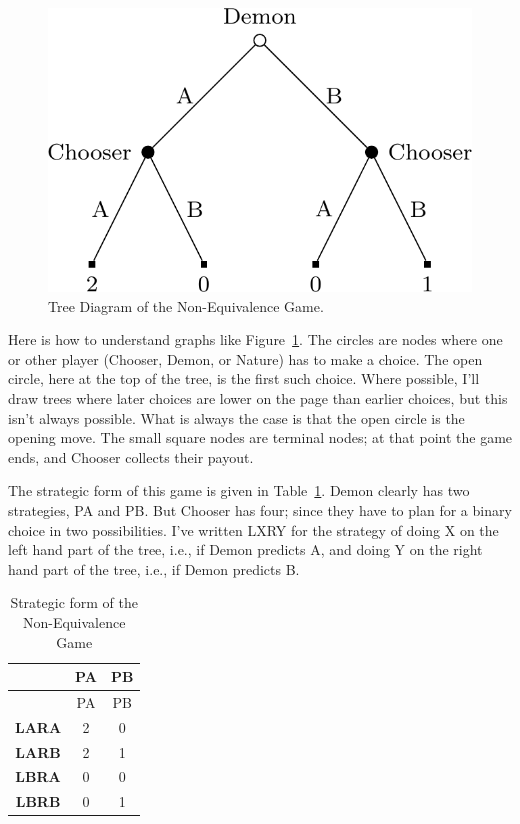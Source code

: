 \documentclass[
  12pt,
  letterpaper,
  DIV=11,
  numbers=noendperiod]{scrreprt}
\begin{document}
\begin{figure}

{\centering \includegraphics{dual_files/figure-pdf/fig-subgame-example-1.png}

}

\caption{\label{fig-subgame-example}Tree Diagram of the Non-Equivalence
Game.}

\end{figure}

Here is how to understand graphs like Figure~\ref{fig-subgame-example}.
The circles are nodes where one or other player (Chooser, Demon, or
Nature) has to make a choice. The open circle, here at the top of the
tree, is the first such choice. Where possible, I'll draw trees where
later choices are lower on the page than earlier choices, but this isn't
always possible. What is always the case is that the open circle is the
opening move. The small square nodes are terminal nodes; at that point
the game ends, and Chooser collects their payout.

The strategic form of this game is given in
Table~\ref{tbl-subgame-example}. Demon clearly has two strategies, PA
and PB. But Chooser has four; since they have to plan for a binary
choice in two possibilities. I've written LXRY for the strategy of doing
X on the left hand part of the tree, i.e., if Demon predicts A, and
doing Y on the right hand part of the tree, i.e., if Demon predicts B.

\hypertarget{tbl-subgame-example}{}
\begin{longtable}[]{@{}ccc@{}}
\caption{\label{tbl-subgame-example}Strategic form of the
Non-Equivalence Game}\tabularnewline
\toprule\noalign{}
& PA & PB \\
\midrule\noalign{}
\endfirsthead
\toprule\noalign{}
& PA & PB \\
\midrule\noalign{}
\endhead
\bottomrule\noalign{}
\endlastfoot
\textbf{LARA} & 2 & 0 \\
\textbf{LARB} & 2 & 1 \\
\textbf{LBRA} & 0 & 0 \\
\textbf{LBRB} & 0 & 1 \\
\end{longtable}
\end{document}
